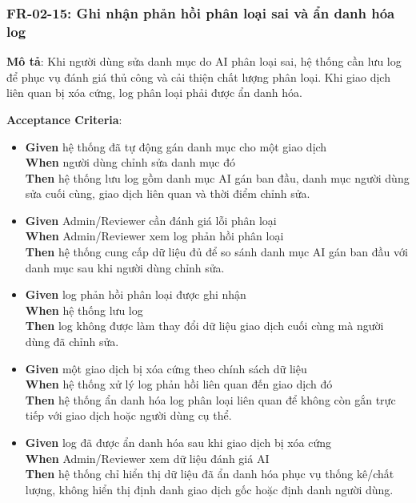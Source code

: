 \subsubsection{FR-02-15: Ghi nhận phản hồi phân loại sai và ẩn danh hóa log}

\textbf{Mô tả}: Khi người dùng sửa danh mục do AI phân loại sai, hệ thống cần lưu log để phục vụ đánh giá thủ công và cải thiện chất lượng phân loại. Khi giao dịch liên quan bị xóa cứng, log phân loại phải được ẩn danh hóa.



\textbf{Acceptance Criteria}:

\begin{itemize}
\item \textbf{Given} hệ thống đã tự động gán danh mục cho một giao dịch  \\ \hspace*{1.5em}  \textbf{When} người dùng chỉnh sửa danh mục đó  \\ \hspace*{1.5em}  \textbf{Then} hệ thống lưu log gồm danh mục AI gán ban đầu, danh mục người dùng sửa cuối cùng, giao dịch liên quan và thời điểm chỉnh sửa.
\item \textbf{Given} Admin/Reviewer cần đánh giá lỗi phân loại  \\ \hspace*{1.5em}  \textbf{When} Admin/Reviewer xem log phản hồi phân loại  \\ \hspace*{1.5em}  \textbf{Then} hệ thống cung cấp dữ liệu đủ để so sánh danh mục AI gán ban đầu với danh mục sau khi người dùng chỉnh sửa.
\item \textbf{Given} log phản hồi phân loại được ghi nhận  \\ \hspace*{1.5em}  \textbf{When} hệ thống lưu log  \\ \hspace*{1.5em}  \textbf{Then} log không được làm thay đổi dữ liệu giao dịch cuối cùng mà người dùng đã chỉnh sửa.
\item \textbf{Given} một giao dịch bị xóa cứng theo chính sách dữ liệu  \\ \hspace*{1.5em}  \textbf{When} hệ thống xử lý log phản hồi liên quan đến giao dịch đó  \\ \hspace*{1.5em}  \textbf{Then} hệ thống ẩn danh hóa log phân loại liên quan để không còn gắn trực tiếp với giao dịch hoặc người dùng cụ thể.
\item \textbf{Given} log đã được ẩn danh hóa sau khi giao dịch bị xóa cứng  \\ \hspace*{1.5em}  \textbf{When} Admin/Reviewer xem dữ liệu đánh giá AI  \\ \hspace*{1.5em}  \textbf{Then} hệ thống chỉ hiển thị dữ liệu đã ẩn danh hóa phục vụ thống kê/chất lượng, không hiển thị định danh giao dịch gốc hoặc định danh người dùng.
\end{itemize}
